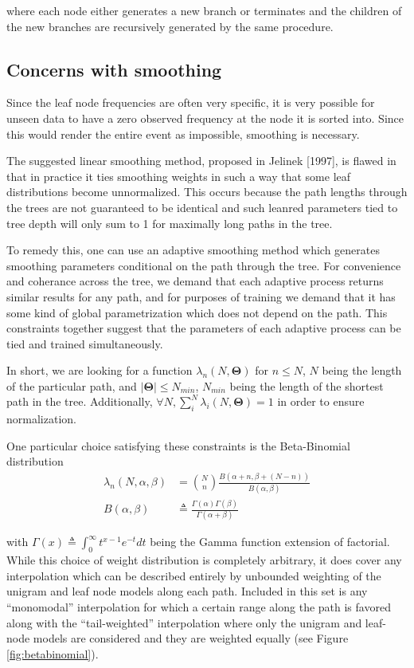 \documentclass[12pt]{article}
\begin{document}
where each node either generates a new branch or terminates and the
children of the new branches are recursively generated by the same
procedure.

\subsection{Concerns with smoothing}

Since the leaf node frequencies are often very specific, it is very
possible for unseen data to have a zero observed frequency at the node
it is sorted into. Since this would render the entire event as
impossible, smoothing is necessary.

The suggested linear smoothing method, proposed in Jelinek [1997], is
flawed in that in practice it ties smoothing weights in such a way
that some leaf distributions become unnormalized. This occurs because
the path lengths through the trees are not guaranteed to be identical
and such leanred parameters tied to tree depth will only sum to 1 for
maximally long paths in the tree.

To remedy this, one can use an adaptive smoothing method which
generates smoothing parameters conditional on the path through the
tree. For convenience and coherance across the tree, we demand that
each adaptive process returns similar results for any path, and for
purposes of training we demand that it has some kind of global
parametrization which does not depend on the path. This constraints
together suggest that the parameters of each adaptive process can be
tied and trained simultaneously.

In short, we are looking for a function $\lambda_n(N,
\mathbf{\Theta})$ for $n \le N$, $N$ being the length of the
particular path, and $|\mathbf{\Theta}| \le N_{min}$, $N_{min}$ being
the length of the shortest path in the tree. Additionally, $\forall N,
\sum_i^N \lambda_i(N, \mathbf{\Theta}) = 1$ in order to ensure
normalization.

One particular choice satisfying these constraints is the
Beta-Binomial distribution
\begin{align}
  \lambda_n(N, \alpha, \beta) 
  &= {N \choose n} \frac{B(\alpha + n, \beta + (N-n))}{B(\alpha, \beta)} \\
  B(\alpha, \beta) 
  &\triangleq \frac{\Gamma(\alpha)\Gamma(\beta)}{\Gamma(\alpha + \beta)}
\end{align}

with $\Gamma(x) \triangleq \int_0^\infty t^{x-1} e^{-t} dt$ being the
Gamma function extension of factorial. While this choice of weight
distribution is completely arbitrary, it does cover any interpolation
which can be described entirely by unbounded weighting of the unigram
and leaf node models along each path. Included in this set is any
``monomodal'' interpolation for which a certain range along the path
is favored along with the ``tail-weighted'' interpolation where only
the unigram and leaf-node models are considered and they are weighted
equally (see Figure \ref{fig:betabinomial}).
\end{document}
